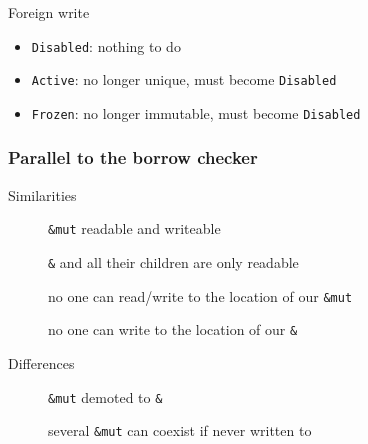\begin{frame}[t]
\begin{onlyenv}
        \begin{block}{Foreign write}
            \begin{itemize}
                \item \texttt{Disabled}: nothing to do
                \item \texttt{Active}: no longer unique, must become \texttt{Disabled}
                \item \texttt{Frozen}: no longer immutable, must become \texttt{Disabled}
            \end{itemize}
        \end{block}
    \end{onlyenv}
\end{frame}

\begin{frame}
    \frametitle{Parallel to the borrow checker}
    Similarities
    \hspace{-5em}
    \begin{description}
        \item[\cmark] \texttt{\&mut} readable and writeable
        \item[\cmark] \texttt{\&} and all their children are only readable
        \item[\cmark] no one can read/write to the location of our \texttt{\&mut}
        \item[\cmark] no one can write to the location of our \texttt{\&}
    \end{description}

    Differences
    \hspace{-5em}
    \begin{description}
        \item[\xmark] \texttt{\&mut} demoted to \texttt{\&}
        \item[\xmark] several \texttt{\&mut} can coexist if never written to
    \end{description}
\end{frame}

